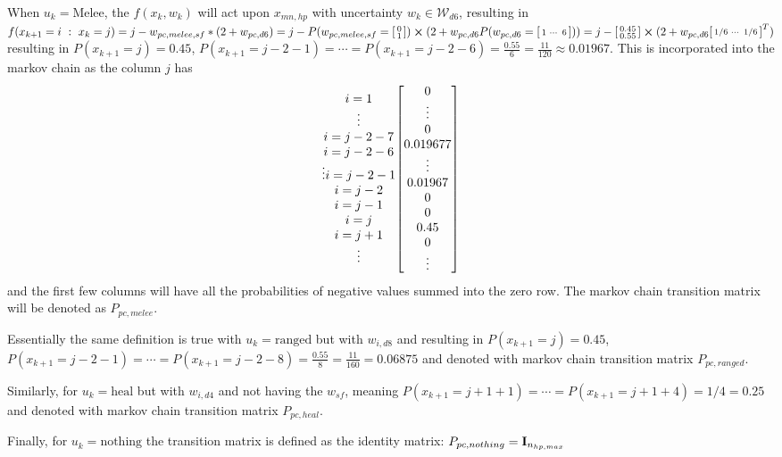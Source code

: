 \documentclass[9pt, onecolumn]{report}
\newcommand{\st}{\ : \ }
\begin{document}
When $u_k = \text{Melee}$, the $f(x_k,w_k)$ will act upon $x_{mn,hp}$ with uncertainty $w_k \in \mathcal{W}_{d6}$, resulting in$
    f(x_{k+1} = i \st x_{k}=j) = j - w_{pc,melee,sf}*(2+w_{pc,d6}) = j - P(w_{pc,melee,sf}=\smqty[0\\1])\cross (2+w_{pc,d6}P(w_{pc,d6}=\smqty[1&\cdots&6])) = j - \smqty[0.45\\0.55] \cross (2+w_{pc,d6}\smqty[1/6& \cdots & 1/6]^T)
$
resulting in $P(x_{k+1} = j) = 0.45$, $P(x_{k+1} = j-2-1) = \cdots = P(x_{k+1} = j-2-6) = \frac{0.55}{6} = \frac{11}{120} \approx 0.01967$.
This is incorporated into the markov chain as the column $j$ has \[
    \mqty{i=1 \\ \vdots \\ i=j-2-7 \\ i=j-2-6\\ \vdots i = j-2-1 \\ i = j-2\\ i= j-1 \\ i=j \\ i=j+1\\ \vdots} \mqty [0\\ \vdots \\ 0\\ 0.019677\\ \vdots \\ 0.01967 \\ 0\\ 0 \\ 0.45 \\ 0 \\ \vdots ]
\]
and the first few columns will have all the probabilities of negative values summed into the zero row.
The markov chain transition matrix will be denoted as $P_{pc,melee}$.

Essentially the same definition is true with $u_k = \text{ranged}$ but with $w_{i,d8}$ and resulting in $P(x_{k+1} = j) = 0.45$, $P(x_{k+1} = j-2-1) = \cdots = P(x_{k+1} = j-2-8) = \frac{0.55}{8} = \frac{11}{160} = 0.06875$ and denoted with markov chain transition matrix $P_{pc,ranged}$.

Similarly, for $u_k = \text{heal}$ but with $w_{i,d4}$ and not having the $w_{sf}$, meaning $P(x_{k+1} = j+1+1) = \cdots = P(x_{k+1} = j+1+4) = 1/4 = 0.25$ and denoted with markov chain transition matrix $P_{pc,heal}$.

Finally, for $u_k = \text{nothing}$ the transition matrix is defined as the identity matrix: $P_{pc,nothing} = \vb{I}_{n_{hp,max}}$
\end{document}
